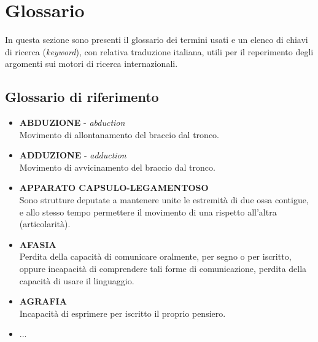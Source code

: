 \emph{\emph{\emph{}}}\appendix


\chapter{Glossario}
In questa sezione sono presenti il glossario dei termini usati e un elenco di chiavi di ricerca (\emph{keyword}), con relativa traduzione italiana, utili per il reperimento degli argomenti sui motori di ricerca internazionali.

\section{\label{sec:Glossario}Glossario di riferimento}
\begin{itemize}
\item \textbf{ABDUZIONE} - \emph{abduction} \\
Movimento di allontanamento del braccio dal tronco.
\item \textbf{ADDUZIONE} - \emph{adduction} \\
Movimento di avvicinamento del braccio dal tronco.
\item \textbf{APPARATO CAPSULO-LEGAMENTOSO} \\
Sono strutture deputate a mantenere unite le estremità di due ossa contigue, e
allo stesso tempo permettere il movimento di una rispetto all'altra (articolarità).
\item \textbf{AFASIA} \\
Perdita della capacità di comunicare oralmente, per segno o per iscritto, oppure
incapacità di comprendere tali forme di comunicazione, perdita della capacità di
usare il linguaggio.
\item \textbf{AGRAFIA} \\
Incapacità di esprimere per iscritto il proprio pensiero.
\item ...
\end{itemize}

